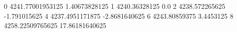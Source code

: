 0 4241.77001953125 1.40673828125
1 4240.36328125 0.0
2 4238.572265625 -1.791015625
4 4237.4951171875 -2.8681640625
6 4243.80859375 3.4453125
8 4258.22509765625 17.86181640625
